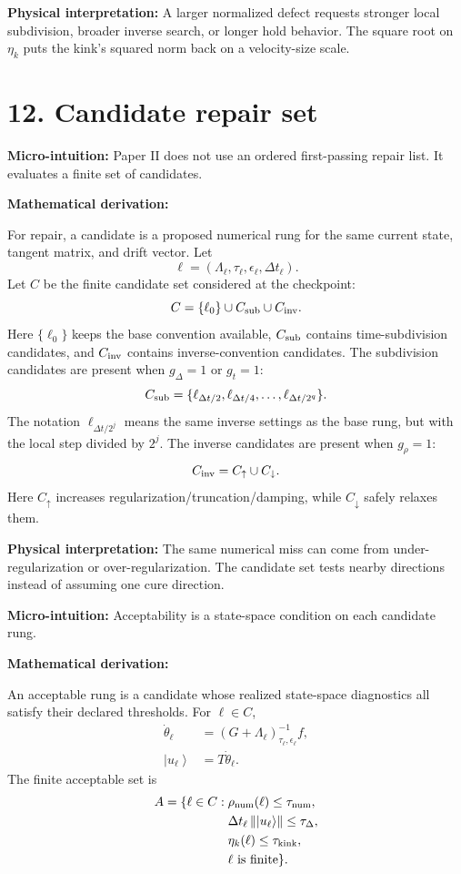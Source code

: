 \documentclass[10pt,twocolumn]{article}
\newcommand{\ket}[1]{\left|#1\right\rangle}
\newcommand{\norm}[1]{\left\lVert #1\right\rVert}
\newcommand{\micro}[1]{%
  \par\smallskip
  \noindent\textcolor{deepblue}{\textbf{Micro-intuition:}} #1
  \par\smallskip}
\newcommand{\deriv}{%
  \par\noindent\textcolor{deepviolet}{\textbf{Mathematical derivation:}}\par\vspace{-1mm}}
\newcommand{\phys}[1]{%
  \par\smallskip
  \noindent\textcolor{deepgreen}{\textbf{Physical interpretation:}} #1
  \par\smallskip}
\begin{document}
\phys{A larger normalized defect requests stronger local subdivision, broader
inverse search, or longer hold behavior. The square root on \(\eta_k\)
puts the kink's squared norm back on a velocity-size scale.}

\section*{12. Candidate repair set}

\micro{Paper II does not use an ordered first-passing repair list. It evaluates
a finite set of candidates.}

\deriv
For repair, a candidate is a proposed numerical rung for the same current
state, tangent matrix, and drift vector. Let
\[
\ell=(\Lambda_\ell,\tau_\ell,\epsilon_\ell,\Delta t_\ell).
\]
Let \(C\) be the finite candidate set considered at the checkpoint:
\[
C=\{\ell_0\}\cup C_{\rm sub}\cup C_{\rm inv}.
\]
Here \(\{\ell_0\}\) keeps the base convention available,
\(C_{\rm sub}\) contains time-subdivision candidates, and \(C_{\rm inv}\)
contains inverse-convention candidates. The subdivision candidates are present
when \(g_\Delta=1\) or \(g_t=1\):
\[
C_{\rm sub}
=
\{\ell_{\Delta t/2},\ell_{\Delta t/4},\ldots,\ell_{\Delta t/2^q}\}.
\]
The notation \(\ell_{\Delta t/2^j}\) means the same inverse settings as the
base rung, but with the local step divided by \(2^j\).
The inverse candidates are present when \(g_\rho=1\):
\[
C_{\rm inv}
=
C_\uparrow\cup C_\downarrow.
\]
Here \(C_\uparrow\) increases regularization/truncation/damping, while
\(C_\downarrow\) safely relaxes them.

\phys{The same numerical miss can come from under-regularization or
over-regularization. The candidate set tests nearby directions instead of
assuming one cure direction.}

\micro{Acceptability is a state-space condition on each candidate rung.}

\deriv
An acceptable rung is a candidate whose realized state-space diagnostics all
satisfy their declared thresholds.
For \(\ell\in C\),
\[
\begin{aligned}
\dot\theta_\ell
&=(G+\Lambda_\ell)_{\tau_\ell,\epsilon_\ell}^{-1}f,\\
\ket{u_\ell}&=T\dot\theta_\ell.
\end{aligned}
\]
The finite acceptable set is
\[
\begin{aligned}
A=\{\ell\in C:\;&
\rho_{\rm num}(\ell)\le\tau_{\rm num},\\
&
\Delta t_\ell\norm{\ket{u_\ell}}\le\tau_\Delta,\\
&
\eta_k(\ell)\le\tau_{\rm kink},\\
&
\ell\text{ is finite}\}.
\end{aligned}
\]
\end{document}
